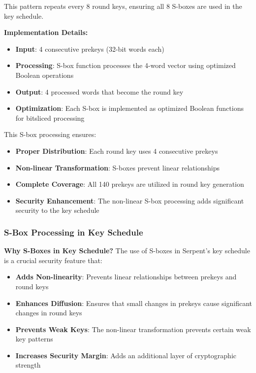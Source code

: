 \documentclass[12pt,a4paper]{article}
\begin{document}
This pattern repeats every 8 round keys, ensuring all 8 S-boxes are used in the key schedule.

\textbf{Implementation Details:}
\begin{itemize}
    \item \textbf{Input}: 4 consecutive prekeys (32-bit words each)
    \item \textbf{Processing}: S-box function processes the 4-word vector using optimized Boolean operations
    \item \textbf{Output}: 4 processed words that become the round key
    \item \textbf{Optimization}: Each S-box is implemented as optimized Boolean functions for bitsliced processing
\end{itemize}

This S-box processing ensures:
\begin{itemize}
    \item \textbf{Proper Distribution}: Each round key uses 4 consecutive prekeys
    \item \textbf{Non-linear Transformation}: S-boxes prevent linear relationships
    \item \textbf{Complete Coverage}: All 140 prekeys are utilized in round key generation
    \item \textbf{Security Enhancement}: The non-linear S-box processing adds significant security to the key schedule
\end{itemize}

\subsubsection{S-Box Processing in Key Schedule}

\textbf{Why S-Boxes in Key Schedule?}
The use of S-boxes in Serpent's key schedule is a crucial security feature that:

\begin{itemize}
    \item \textbf{Adds Non-linearity}: Prevents linear relationships between prekeys and round keys
    \item \textbf{Enhances Diffusion}: Ensures that small changes in prekeys cause significant changes in round keys
    \item \textbf{Prevents Weak Keys}: The non-linear transformation prevents certain weak key patterns
    \item \textbf{Increases Security Margin}: Adds an additional layer of cryptographic strength
\end{itemize}
\end{document}
